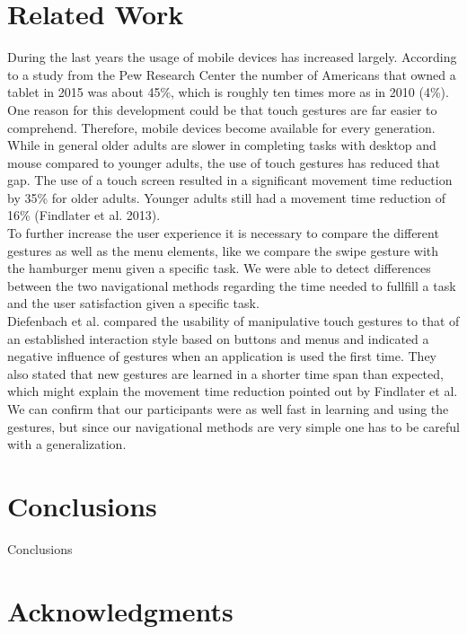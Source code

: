 \documentclass{sig-alternate-05-2015}
\begin{document}
\section{Related Work}
During the last years the usage of mobile devices has increased largely. According to a study from the Pew Research Center
the number of Americans that owned a tablet in 2015 was about 45\%, which is roughly ten times more as in 2010 (4\%). One reason
for this development could be that touch gestures are far easier to comprehend. Therefore, mobile devices become available for every generation. While in general older adults are slower in completing tasks with desktop and mouse compared to younger adults, the use of touch gestures has reduced that gap. The use of a touch screen resulted in a significant movement time reduction by 35\% for older adults. Younger adults still had a movement time reduction of 16\% (Findlater
et al. 2013).\\ To further increase the user experience it is necessary to compare the different gestures as well as the menu elements, like we compare the swipe gesture with the hamburger menu given a specific task. We were able to detect differences between the two navigational methods regarding the time needed to fullfill a task and the user satisfaction given a specific task.\\ Diefenbach et al. compared the usability of manipulative touch gestures to that of an established interaction style based on buttons and menus and indicated a negative influence of gestures when an application is used the first time. They also stated that new gestures are learned in a shorter time span than expected, which might explain the movement time reduction pointed out by Findlater
et al. We can confirm that our participants were as well fast in learning and using the gestures, but since our navigational methods are very simple one has to be careful with a generalization.
\section{Conclusions}
Conclusions

\section{Acknowledgments}
\end{document}
